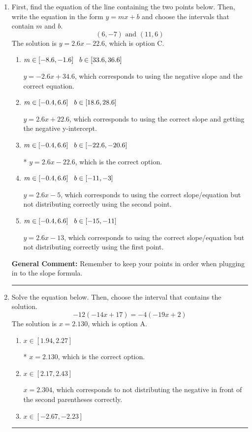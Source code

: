 \documentclass{extbook}[14pt]
\newcommand{\litem}[1]{\item #1

\rule{\textwidth}{0.4pt}}
\begin{document}
\begin{enumerate}\litem{
First, find the equation of the line containing the two points below. Then, write the equation in the form $ y=mx+b $ and choose the intervals that contain $m$ and $b$.
\[ (6, -7) \text{ and } (11, 6) \]The solution is \( y = 2.6x -22.6 \), which is option C.\begin{enumerate}[label=\Alph*.]
\item \( m \in [-8.6, -1.6] \hspace*{3mm} b \in [33.6, 36.6] \)

 $y = -2.6x + 34.6$, which corresponds to using the negative slope and the correct equation.
\item \( m \in [-0.4, 6.6] \hspace*{3mm} b \in [18.6, 28.6] \)

 $y = 2.6x + 22.6$, which corresponds to using the correct slope and getting the negative y-intercept.
\item \( m \in [-0.4, 6.6] \hspace*{3mm} b \in [-22.6, -20.6] \)

* $y = 2.6x -22.6$, which is the correct option.
\item \( m \in [-0.4, 6.6] \hspace*{3mm} b \in [-11, -3] \)

 $y = 2.6x -5$, which corresponds to using the correct slope/equation but not distributing correctly using the second point.
\item \( m \in [-0.4, 6.6] \hspace*{3mm} b \in [-15, -11] \)

 $y = 2.6x -13$, which corresponds to using the correct slope/equation but not distributing correctly using the first point.
\end{enumerate}

\textbf{General Comment:} Remember to keep your points in order when plugging in to the slope formula.
}
\litem{
Solve the equation below. Then, choose the interval that contains the solution.
\[ -12(-14x + 17) = -4(-19x + 2) \]The solution is \( x = 2.130 \), which is option A.\begin{enumerate}[label=\Alph*.]
\item \( x \in [1.94, 2.27] \)

* $x = 2.130$, which is the correct option.
\item \( x \in [2.17, 2.43] \)

$x = 2.304$, which corresponds to not distributing the negative in front of the second parentheses correctly.
\item \( x \in [-2.67, -2.23] \)


\end{enumerate}}
\end{enumerate}
\end{document}

